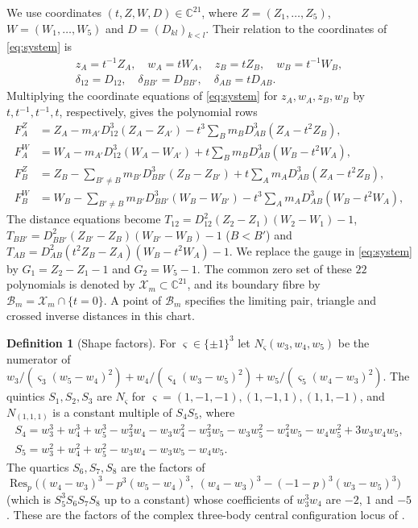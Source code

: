 \documentclass[Threeside,11pt]{article}
\theoremstyle{definition}
\newtheorem{definition}[theorem]{Definition}
\theoremstyle{remark}
\numberwithin{equation}{section}
\newcommand{\C}{\mathbb C}\newcommand{\T}{\mathbb T}
\theoremstyle{remark}
\begin{document}
{We use coordinates $(t,Z,W,D)\in\C^{21}$, where $Z=(Z_1,\dots,Z_5)$,
$W=(W_1,\dots,W_5)$ and $D=(D_{kl})_{k<l}$.  Their relation to the coordinates of
\eqref{eq:system} is}
\begin{equation}\label{eq:d2-chart}
\begin{gathered}
  z_A=t^{-1}Z_A,\quad w_A=tW_A,\quad z_B=tZ_B,\quad w_B=t^{-1}W_B,\\
  \delta_{12}=D_{12},\quad \delta_{BB'}=D_{BB'},\quad \delta_{AB}=tD_{AB}.
\end{gathered}
\end{equation}
{Multiplying the coordinate equations of \eqref{eq:system} for
$z_A,w_A,z_B,w_B$ by $t,t^{-1},t^{-1},t$, respectively, gives the polynomial rows}
\begin{equation}\label{eq:d2-rows}
\begin{aligned}
  F^Z_A&=Z_A-m_{A'}D_{12}^3(Z_A-Z_{A'})-t^3\textstyle\sum_Bm_BD_{AB}^3(Z_A-t^2Z_B),\\
  F^W_A&=W_A-m_{A'}D_{12}^3(W_A-W_{A'})+t\textstyle\sum_Bm_BD_{AB}^3(W_B-t^2W_A),\\
  F^Z_B&=Z_B-\textstyle\sum_{B'\ne B}m_{B'}D_{BB'}^3(Z_B-Z_{B'})
         +t\textstyle\sum_Am_AD_{AB}^3(Z_A-t^2Z_B),\\
  F^W_B&=W_B-\textstyle\sum_{B'\ne B}m_{B'}D_{BB'}^3(W_B-W_{B'})
         -t^3\textstyle\sum_Am_AD_{AB}^3(W_B-t^2W_A),
\end{aligned}
\end{equation}
{The distance equations become $T_{12}=D_{12}^2(Z_2-Z_1)(W_2-W_1)-1$,
$T_{BB'}=D_{BB'}^2(Z_{B'}-Z_B)(W_{B'}-W_B)-1$ ($B<B'$) and
$T_{AB}=D_{AB}^2(t^2Z_B-Z_A)(W_B-t^2W_A)-1$.
We replace the gauge in \eqref{eq:system} by $G_1=Z_2-Z_1-1$ and $G_2=W_5-1$.
The common zero set of these $22$ polynomials is denoted by $\mathcal X_m\subset\C^{21}$,
and its boundary fibre by $\mathcal B_m=\mathcal X_m\cap\{t=0\}$.
A point of $\mathcal B_m$ specifies the limiting pair, triangle and crossed inverse
distances in this chart.}

\begin{definition}[Shape factors]\label{def:d2-shapes}
For $\varsigma\in\{\pm1\}^3$ let $N_\varsigma(w_3,w_4,w_5)$ be the numerator of
$w_3/(\varsigma_3(w_5-w_4)^2)+w_4/(\varsigma_4(w_3-w_5)^2)+w_5/(\varsigma_5(w_4-w_3)^2)$.  The
quintics $S_1,S_2,S_3$ are $N_\varsigma$ for $\varsigma=(1,-1,-1),(1,-1,1),(1,1,-1)$, and
$N_{(1,1,1)}$ is a constant multiple of $S_4S_5$, where
\begin{gather*}
  S_4=w_3^3+w_4^3+w_5^3-w_3^2w_4-w_3w_4^2-w_3^2w_5-w_3w_5^2-w_4^2w_5-w_4w_5^2+3w_3w_4w_5,\\
  S_5=w_3^2+w_4^2+w_5^2-w_3w_4-w_3w_5-w_4w_5 .
\end{gather*}
The quartics $S_6,S_7,S_8$ are the factors of
$\operatorname{Res}_p\bigl((w_4-w_3)^3-p^3(w_5-w_4)^3,\ (w_4-w_3)^3-(-1-p)^3(w_3-w_5)^3\bigr)$
(which is $S_5^3S_6S_7S_8$ up to a constant) whose coefficients of $w_3^3w_4$ are $-2$, $1$ and
$-5$.  These are the factors of the complex three-body central configuration locus of
\cite[Appendix, pp.~585--586]{AK}.
\end{definition}
\end{document}
